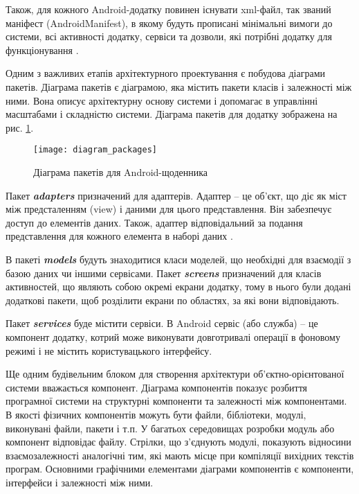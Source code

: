 \documentclass[../main.tex]{subfiles}
\begin{document}
Також, для кожного Android-додатку повинен існувати xml-файл, так званий маніфест (AndroidManifest), в якому будуть прописані мінімальні вимоги до системи, всі активності додатку, сервіси та дозволи, які потрібні додатку для функціонування \cite{pro_android}.

Одним з важливих етапів архітектурного проектування є побудова діаграми пакетів. Діаграма пакетів є діаграмою, яка містить пакети класів і залежності між ними. Вона описує архітектурну основу системи і допомагає в управлінні масштабами і складністю системи. Діаграма пакетів для додатку зображена на рис. \ref{diagram:packages}.
\vspace{\baselineskip}

\begin{figure}[H]
	\centering
	\texttt{[image: diagram\_packages]}
	\caption{Діаграма пакетів для Android-щоденника}
	\label{diagram:packages}
\end{figure}

Пакет \textit{\textbf{adapters}} призначений для адаптерів. Адаптер -- це об'єкт, що діє як міст між предсталенням (view) і даними для цього представлення. Він забезпечує доступ до елементів даних. Також, адаптер відповідальний за подання представлення для кожного елемента в наборі даних \cite{adapter}. 

В пакеті \textit{\textbf{models}} будуть знаходитися класи моделей, що необхідні для взаємодії з базою даних чи іншими сервісами. Пакет \textit{\textbf{screens}} призначений для класів активностей, що являють собою окремі екрани додатку, тому в нього були додані додаткові пакети, щоб розділити екрани по областях, за які вони відповідають.

Пакет \textit{\textbf{services}} буде містити сервіси. В Android сервіс (або служба) -- це компонент додатку, котрий може виконувати	довготривалі операції в фоновому режимі і не містить користувацького інтерфейсу.

Ще одним будівельним блоком для створення архітектури об'єктно-орієнтованої системи вважається компонент. Діаграма компонентів показує розбиття програмної системи на структурні компоненти та залежності між компонентами. В якості фізичних компонентів можуть бути файли, бібліотеки, модулі, виконувані файли, пакети і т.п. У багатьох середовищах розробки модуль або компонент відповідає файлу. Стрілки, що з'єднують модулі, показують відносини взаємозалежності аналогічні тим, які мають місце при компіляції вихідних текстів програм. Основними графічними елементами діаграми компонентів є компоненти, інтерфейси і залежності між ними. 
\end{document}
